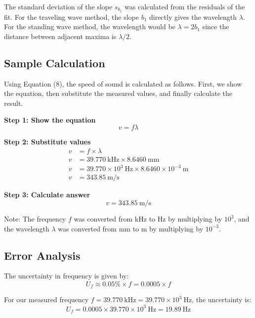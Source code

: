 \documentclass[12pt]{article}
\begin{document}
The standard deviation of the slope $s_{b_1}$ was calculated from the residuals of the fit. For the traveling wave method, the slope $b_1$ directly gives the wavelength $\lambda$. For the standing wave method, the wavelength would be $\lambda = 2b_1$ since the distance between adjacent maxima is $\lambda/2$.

\subsection{Sample Calculation}

Using Equation (8), the speed of sound is calculated as follows. First, we show the equation, then substitute the measured values, and finally calculate the result.

\textbf{Step 1: Show the equation}
\begin{equation}
v = f\lambda
\end{equation}

\textbf{Step 2: Substitute values}
\begin{align}
v &= f \times \lambda \\
v &= 39.770~\si{\kilo\hertz} \times 8.6460~\si{\milli\meter} \\
v &= 39.770 \times 10^3~\si{\hertz} \times 8.6460 \times 10^{-3}~\si{\meter} \\
v &= 343.85~\si{\meter\per\second}
\end{align}

\textbf{Step 3: Calculate answer}
\begin{equation}
v = 343.85~\si{\meter\per\second}
\end{equation}

Note: The frequency $f$ was converted from \si{\kilo\hertz} to \si{\hertz} by multiplying by $10^3$, and the wavelength $\lambda$ was converted from \si{\milli\meter} to \si{\meter} by multiplying by $10^{-3}$.

\subsection{Error Analysis}

The uncertainty in frequency is given by:
\begin{equation}
U_f \approx 0.05\% \times f = 0.0005 \times f
\end{equation}

For our measured frequency $f = 39.770~\si{\kilo\hertz} = 39.770 \times 10^3~\si{\hertz}$, the uncertainty is:
\begin{equation}
U_f = 0.0005 \times 39.770 \times 10^3~\si{\hertz} = 19.89~\si{\hertz}
\end{equation}
\end{document}

